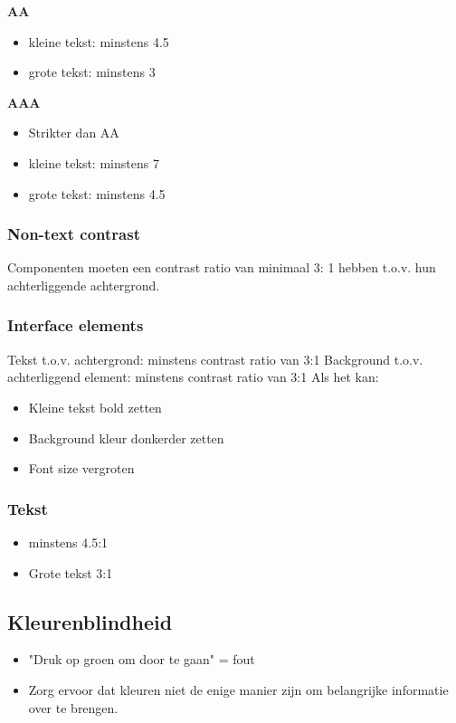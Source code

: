 \documentclass{article}
\newcommand{\bold}[1]{\textbf{#1}}
\begin{document}
\bold{AA}
\begin{itemize}
    \item kleine tekst: minstens 4.5
    \item grote tekst: minstens 3 
\end{itemize}

\bold{AAA}
\begin{itemize}
    \item Strikter dan AA
    \item kleine tekst: minstens 7
    \item grote tekst: minstens 4.5
\end{itemize}

\subsubsection{Non-text contrast}
Componenten moeten een contrast ratio van minimaal 3: 1 hebben t.o.v. hun achterliggende achtergrond. 

\subsubsection{Interface elements}
Tekst t.o.v. achtergrond: minstens contrast ratio van 3:1
Background t.o.v. achterliggend element: minstens contrast ratio van 3:1
Als het kan: 
\begin{itemize}
    \item Kleine tekst bold zetten
    \item Background kleur donkerder zetten
    \item Font size vergroten
\end{itemize}

\subsubsection{Tekst}
\begin{itemize}
    \item minstens 4.5:1
    \item Grote tekst 3:1
\end{itemize}

\subsection{Kleurenblindheid}
\begin{itemize}
    \item "Druk op groen om door te gaan" = fout
    \item Zorg ervoor dat kleuren niet de enige manier zijn om belangrijke informatie over te brengen.
\end{itemize}
    
\end{document}

